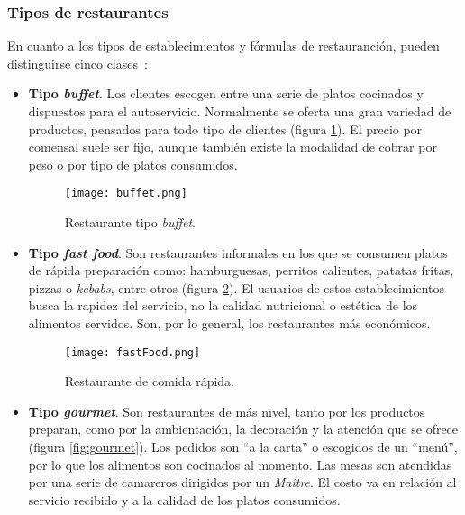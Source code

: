     \subsubsection{Tipos de restaurantes}
  En cuanto a los tipos de establecimientos y fórmulas de restauranción, pueden
  distinguirse cinco clases~\cite{bib:wiki}:
  \begin{itemize}
  \item \textbf{Tipo \emph{buffet}}. Los clientes escogen entre una serie de
  platos cocinados y dispuestos para el autoservicio. Normalmente se oferta
  una gran variedad de productos, pensados para todo tipo de clientes (figura
  \ref{fig:buffet}). El precio por comensal suele ser fijo, aunque también
  existe la modalidad de cobrar por peso o por tipo de platos consumidos.

  \begin{figure}[!h]
    \begin{center}
      \texttt{[image: buffet.png]}
      \caption{Restaurante tipo \emph{buffet}.}
      \label{fig:buffet}
    \end{center}
  \end{figure}

  \item \textbf{Tipo \emph{fast food}}. Son restaurantes informales en los que
  se consumen platos de rápida preparación como: hamburguesas, perritos
  calientes, patatas fritas, pizzas o \emph{kebabs}, entre otros (figura
  \ref{fig:fastFood}). El usuarios de estos establecimientos busca la rapidez 
  del servicio, no la calidad nutricional o estética de los alimentos 
  servidos. Son, por lo general, los restaurantes más económicos.

  \begin{figure}[!h]
    \begin{center}
      \texttt{[image: fastFood.png]}
      \caption{Restaurante de comida rápida.}
      \label{fig:fastFood}
    \end{center}
  \end{figure}

  \item \textbf{Tipo \emph{gourmet}}. Son restaurantes de más nivel, tanto por
  los productos preparan, como por la ambientación, la decoración y la atención
  que se ofrece (figura \ref{fig:gourmet}). Los pedidos son ``a la carta'' o
  escogidos de un ``menú'', por lo que los alimentos son cocinados al momento.
  Las mesas son atendidas por una serie de camareros dirigidos por un
  \emph{Maître}. El costo va en relación al servicio recibido y a la calidad de
  los platos consumidos.


\end{itemize}
